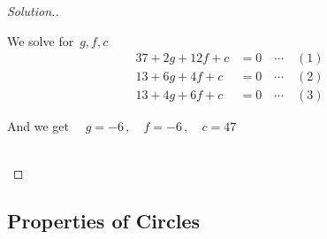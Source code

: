 \documentclass[11pt,a4paper]{article}
\theoremstyle{definition}
\newenvironment{solution}
  {\renewcommand{\qedsymbol}{}\begin{proof}[\textit{Solution}.]}
  {\end{proof}}
\begin{document}
\begin{solution}
\begin{enumerate}
We solve for $\, g, f, c$
\begin{align*}
37 + 2g + 12f + c & =  0\quad  \cdots\quad  (1)\\
13 + 6g + 4f  + c & =  0\quad  \cdots\quad  (2)\\
13 + 4g + 6f +  c & =  0\quad  \cdots\quad  (3)
\end{align*}

And we get $\quad  g = -6\,, \quad  f = -6\, , \quad  c = 47$\\\\
\end{enumerate}
\end{solution}
\subsection{Properties of Circles}
\end{document}
